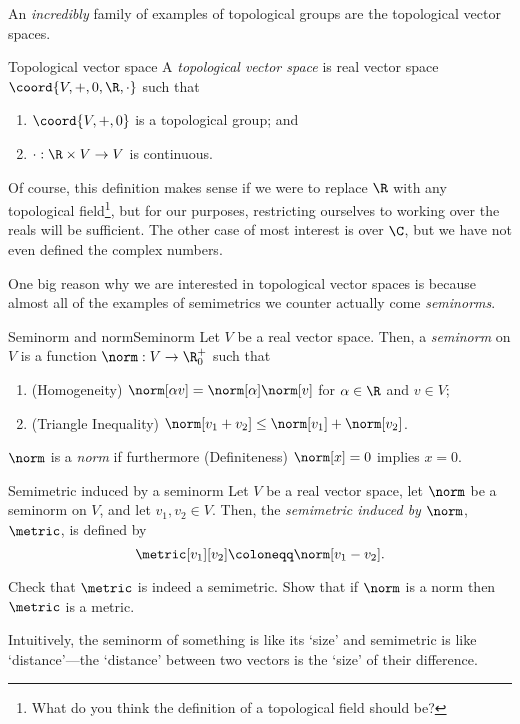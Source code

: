 An \emph{incredibly} family of examples of topological groups are the topological vector spaces.
\begin{dfn}{Topological vector space}{}
A \emph{topological vector space} is real vector space $\coord{V,+,0,\R ,\cdot}$ such that
\begin{enumerate}
\item $\coord{V,+,0}$ is a topological group; and
\item $\cdot :\R \times V\rightarrow V$ is continuous.
\end{enumerate}
\begin{rmk}
Of course, this definition makes sense if we were to replace $\R$ with any topological field\footnote{What do you think the definition of a topological field should be?}, but for our purposes, restricting ourselves to working over the reals will be sufficient.  The other case of most interest is over $\C$, but we have not even defined the complex numbers.
\end{rmk}
\end{dfn}
One big reason why we are interested in topological vector spaces is because almost all of the examples of semimetrics we counter actually come \emph{seminorms}.
\begin{dfn}{Seminorm and norm}{Seminorm}
Let $V$ be a real vector space.  Then, a \emph{seminorm} on $V$ is a function $\norm :V\rightarrow \R _0^+$ such that
\begin{enumerate}
\item (Homogeneity) $\norm[\alpha v]=\norm[\alpha ]\norm[v]$ for $\alpha \in \R$ and $v\in V$;
\item (Triangle Inequality) $\norm[v_1+v_2]\leq \norm[v_1]+\norm[v_2]$.
\end{enumerate}
$\norm$ is a \emph{norm} if furthermore (Definiteness) $\norm[x]=0$ implies $x=0$.
\end{dfn}
\begin{dfn}{Semimetric induced by a seminorm}{}
Let $V$ be a real vector space, let $\norm$ be a seminorm on $V$, and let $v_1,v_2\in V$.  Then, the \emph{semimetric induced by $\norm$}, $\metric$, is defined by
\begin{equation}
\metric[v_1][v_2]\coloneqq \norm[v_1-v_2].
\end{equation}
\begin{exr}[breakable=false]{}{}
Check that $\metric$ is indeed a semimetric.  Show that if $\norm$ is a norm then $\metric$ is a metric.
\end{exr}
\begin{rmk}
Intuitively, the seminorm of something is like its `size' and semimetric is like `distance'---the `distance' between two vectors is the `size' of their difference.
\end{rmk}
\end{dfn}
